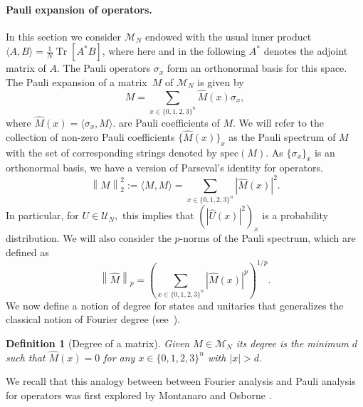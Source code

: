 \documentclass[11pt]{article}
\newcommand{\norm}[1]{\left\|{#1}\right\|}
\theoremstyle{plain}
\newtheorem{dfn}{Definition}
\DeclareMathOperator{\Tr}{Tr}
\theoremstyle{plain}
\theoremstyle{definition}
\theoremstyle{remark}
\theoremstyle{named}
\begin{document}
\paragraph{Pauli expansion of operators.} In this section we consider $\mathcal{M}_N$ endowed with the usual inner product $\langle A,B\rangle =
\frac{1}{N}\Tr[A^* B]$, where here  and in the following $A^*$ denotes the adjoint matrix of $A$.  The Pauli operators $\sigma_x$
form an orthonormal basis for this space.
The Pauli expansion of a matrix~$M$ of $\mathcal{M}_N$  is given by
\begin{equation}
    M = \sum_{x \in \{0,1,2,3\}^n} \widehat M(x) \sigma_x, 
\end{equation}
where $\widehat{M}(x) = \langle \sigma_x,M\rangle$.
are Pauli coefficients of $M$. We will refer to the collection of non-zero Pauli coefficients $\{\widehat{M}(x)\}_x$ as the Pauli spectrum of $M$ with the set of corresponding strings denoted by $\mathrm{spec}(M)$. As $\{\sigma_x\}_x$ is an orthonormal basis, we have a version of Parseval's identity for operators. 
\begin{equation}
    \norm{M}_2^2:=\langle M,M\rangle=\sum_{x\in \{0,1,2,3\}^n}|\widehat M(x)|^2.
\end{equation}
In particular, for $U\in\mathcal{U}_N,$ this implies that  $(|\widehat U(x)|^2)_x$ is a probability distribution. 
We will also consider the $p$-norms of the Pauli spectrum, which are defined as $$\norm{\widehat M}_p=\left(\sum_{x\in\{0,1,2,3\}^n}|\widehat M(x)|^p\right)^{1/p}.$$
We now define a notion of degree for states and unitaries that generalizes the classical notion of Fourier degree (see~\cite[Section 5]{montanaro2008quantum}).

\begin{dfn}[Degree of a matrix]\label{def:deg_rho}
Given $M\in\mathcal{M}_N$ its degree is the minimum $d$ such that $\widehat{M}(x)=0$ for any $x \in \{0,1,2,3\}^n$ with $|x|>d$.
\end{dfn} 
We recall that this analogy between between Fourier analysis and Pauli analysis for operators was first explored by Montanaro and Osborne \cite{montanaro2008quantum}.
\end{document}
